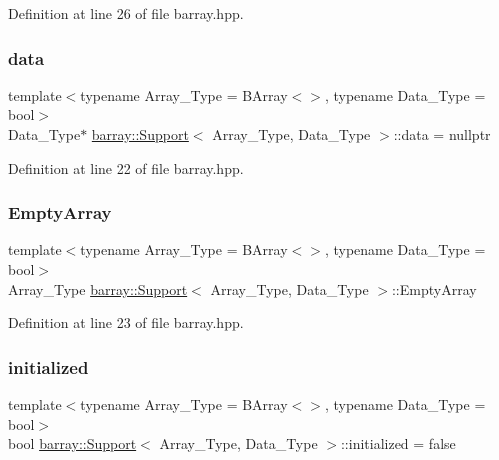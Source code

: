 Definition at line 26 of file barray.\+hpp.

\mbox{\label{classbarray_1_1_support_a5154e40ba3276e0378b78d06ff63cd8e}} 
\subsubsection{\texorpdfstring{data}{data}}
{\footnotesize\ttfamily template$<$typename Array\+\_\+\+Type  = B\+Array$<$$>$, typename Data\+\_\+\+Type  = bool$>$ \\
Data\+\_\+\+Type$\ast$ \hyperlink{classbarray_1_1_support}{barray\+::\+Support}$<$ Array\+\_\+\+Type, Data\+\_\+\+Type $>$\+::data = nullptr}



Definition at line 22 of file barray.\+hpp.

\mbox{\label{classbarray_1_1_support_a7e3007df178a2b6dd4bbe02e355bc174}} 
\subsubsection{\texorpdfstring{Empty\+Array}{EmptyArray}}
{\footnotesize\ttfamily template$<$typename Array\+\_\+\+Type  = B\+Array$<$$>$, typename Data\+\_\+\+Type  = bool$>$ \\
Array\+\_\+\+Type \hyperlink{classbarray_1_1_support}{barray\+::\+Support}$<$ Array\+\_\+\+Type, Data\+\_\+\+Type $>$\+::Empty\+Array}



Definition at line 23 of file barray.\+hpp.

\mbox{\label{classbarray_1_1_support_ad54a705b49123c3cbf4b7eb546c0bcf5}} 
\subsubsection{\texorpdfstring{initialized}{initialized}}
{\footnotesize\ttfamily template$<$typename Array\+\_\+\+Type  = B\+Array$<$$>$, typename Data\+\_\+\+Type  = bool$>$ \\
bool \hyperlink{classbarray_1_1_support}{barray\+::\+Support}$<$ Array\+\_\+\+Type, Data\+\_\+\+Type $>$\+::initialized = false}



